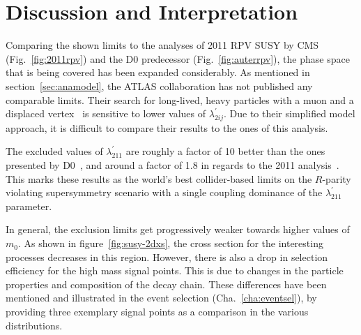 \section{Discussion and Interpretation}
\label{sec:discussion}

Comparing the shown limits to the analyses of 2011 RPV SUSY by CMS (Fig.~\ref{fig:2011rpv}) and the D0 predecessor (Fig.~\ref{fig:auterrpv}), the phase space that is being covered has been expanded considerably. As mentioned in section~\ref{sec:anamodel}, the ATLAS collaboration has not published any comparable limits. Their search for long-lived, heavy particles with a muon and a displaced vertex~\cite{atlasrpv} is sensitive to lower values of $\lambda^\prime_{2ij}$. Due to their simplified model approach, it is difficult to compare their results to the ones of this analysis.

The excluded values of $\lambda^{\prime}_{211}$ are roughly a factor of 10 better than the ones presented by D0~\cite{auter,d0rpv}, and around a factor of 1.8 in regards to the 2011 analysis~\cite{2011rpv}. This marks these results as the world's best collider-based limits on the $R$-parity violating supersymmetry scenario with a single coupling dominance of the $\lambda^{\prime}_{211}$ parameter.

In general, the exclusion limits get progressively weaker towards higher values of $m_0$. As shown in figure~\ref{fig:susy-2dxs}, the cross section for the interesting processes decreases in this region. However, there is also a drop in selection efficiency for the high mass signal points. This is due to changes in the particle properties and composition of the decay chain. These differences have been mentioned and illustrated in the event selection (Cha.~\ref{cha:eventsel}), by providing three exemplary signal points as a comparison in the various distributions.

